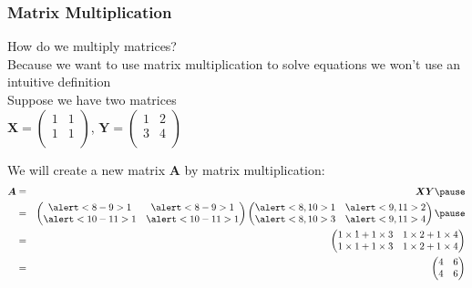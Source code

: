\documentclass{beamer}
\numberwithin{equation}{section}
\begin{document}
\begin{frame}
\frametitle{Matrix Multiplication}

How do we multiply matrices? \pause \\
Because we want to use matrix multiplication to solve equations we won't use an intuitive definition \pause \\

Suppose we have two matrices \pause  \\
$\boldsymbol{X} = \begin{pmatrix} 1 & 1 \\ 1& 1 \\ \end{pmatrix} $, $\boldsymbol{Y} = \begin{pmatrix} 1 & 2 \\ 3 & 4 \\ \end{pmatrix} $ \pause 

We will create a new matrix $\boldsymbol{A}$ by matrix multiplication: \pause 
\begin{eqnarray} 
\boldsymbol{A} & = & \boldsymbol{X} \boldsymbol{Y} \nonumber  \pause \\
				& = & \begin{pmatrix} \alert<8-9>{1} & \alert<8-9>{1} \\ \alert<10-11>{1}& \alert<10-11>{1}\\ \end{pmatrix} \begin{pmatrix} \alert<8,10>{1} & \alert<9,11>{2} \\ \alert<8,10>{3} & \alert<9,11>{4} \\ \end{pmatrix}
\nonumber  \pause \\
     					& = & \begin{pmatrix} 
							1 \times 1 + 1 \times 3  & 1 \times 2 + 1 \times 4  \\
							1 \times 1  + 1\times 3  & 1 \times 2 + 1 \times 4   \\
							\end{pmatrix} \nonumber \\
					& = & \begin{pmatrix} 
							4 & 6 \\
							4 & 6 \\
							\end{pmatrix}		
							\nonumber 
\end{eqnarray}							

\end{frame}
\end{document}
